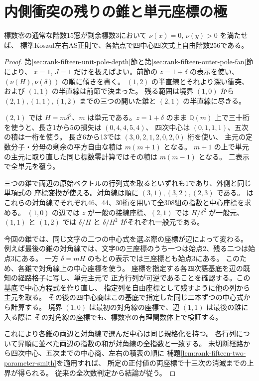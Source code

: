 \section{内側衝突の残りの錐と単元座標の極}
\label{sec:rank-fifteen-inner-collision-fan}
\begin{theorem}\label{thm:rank-fifteen-inner-collision-fan}
標数零の通常な階数15窓が剰余標数3において $\nu(x)=0$, $\nu(y)>0$ を満たせば、
標準Koszul左右AS正則で、各始点で四中心四次式上自由階数256である。
\end{theorem}
\begin{proof}
第\ref{sec:rank-fifteen-unit-pole-depth}節と第\ref{sec:rank-fifteen-outer-pole-fan}節により、
$\bar x=1$, $\bar J=1$ だけを扱えばよい。前節の $z=1+\delta$ の表示を使い、
$(\nu(H),\nu(\delta))$ の順に傾きを書く。
$(1,2)$ の半直線とそれより深い衝突、および $(1,1)$ の半直線は前節で決まった。
残る範囲は境界 $(1,0)$ から $(2,1),(1,1),(1,2)$ までの三つの開いた錐と
$(2,1)$ の半直線に尽きる。

$(2,1)$ では $H=m\delta^2$、$m$ は単元である。$z=1+\delta$ のまま
$\mathbb Q(m)$ 上で三十桁を使うと、長さ1から5の損失は $(0,4,4,5,4)$、
四次中心は $(0,1,1,1)$、五次の積は一桁を使う。
長さ6から13では $(3,0,2,1,2,0,2,0)$ 桁を使い、
主元の定数分子・分母の剰余の平方自由な積は $m(m+1)$ となる。
$m+1$ の上で単元の主元に取り直した同じ標数零計算ではその積は $m(m-1)$ となる。
二表示で全単元を覆う。

三つの錐で両辺の原始ベクトルの行列式を取るといずれも1であり、外側と同じ単項式の
座標変換が使える。対角線は順に $(3,1),(3,2),(2,3)$ である。
 は
これらの対角線でそれぞれ46、44、30桁を用いて全308組の指数と中心座標を求める。
$(1,0)$ の辺では $z$ が一般の接線座標、$(2,1)$ では $H/\delta^2$ が一般元、
$(1,1)$ と $(1,2)$ では $\delta/H$ と $\delta/H^2$ がそれぞれ一般元である。

今回の錐では、同じ文字の二つの中心式を選ぶ際の座標が辺によって変わる。
例えば最後の錐の対角線では、文字0の三座標のうち一つは始点2、残る二つは始点3にある。
一方 $\delta=mH$ のもとの表示では三座標とも始点3にある。
このため、各錐で対角線上の中心座標を使う。
座標を指定する各四次語基底を辺の既知の経路格子に写し、単元主元で
正方行列が可逆であることを確認する。この基底で中心方程式を作り直し、
指定列を自由座標として残すように他の列から主元を取る。
その後の四中心商はこの基底で指定した同じ二本ずつの中心式から計算する。
境界 $(1,0)$ は最初の対角線の座標で、辺 $(1,1)$ は最後の錐に入る際に
その対角線の座標でも、標数零の有理関数体上で検証する。

これにより各錐の両辺と対角線で選んだ中心は同じ規格化を持つ。
各行列について昇順に並べた両辺の指数の和が対角線の全指数と一致する。
未切断経路から四次中心、五次までの中心商、左右の積表の順に
補題\ref{lem:rank-fifteen-two-parameter-smith}を適用すれば、
所定の正付値の両座標で十三次の消滅までの上界が得られる。
従来の全次数判定から結論が従う。
\end{proof}

